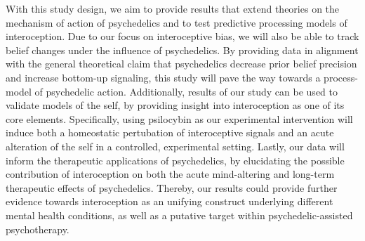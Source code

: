 \documentclass{article}
\begin{document}
\begin{comment}
    • Ensure that your predictions are defined precisely in terms of the specific independent and dependent variables. 
    • Listing them as Hypothesis 1, Hypothesis 2 etc (with corresponding H0 in each case, as appropriate) is recommended.
    • The description of hypotheses must commit to interpretation of all potential data patterns (those that are predicted and those that would run counter to predictions). You cannot interpret lack of evidence (e.g. a p>0.05 in a t-test) for the existence of an effect in null hypothesis significance testing as evidence for the absence of an effect. To be able to interpret data patterns other than the predicted effect or a significant difference in the opposite direction, you must commit to using Bayesian inferential methods or frequentist equivalence testing.
    • Where you describe your hypotheses, you must include a call-out to the mandatory Design Table (Table 1) – below. 
\end{comment}



With this study design, we aim to provide results that extend theories on the mechanism of action of psychedelics and to test predictive processing models of interoception. Due to our focus on interoceptive bias, we will also be able to track belief changes under the influence of psychedelics. 
By providing data in alignment with the general theoretical claim that psychedelics decrease prior belief precision and increase bottom-up signaling, this study will pave the way towards a process-model of psychedelic action. %
Additionally, results of our study can be used to validate models of the self, by providing insight into interoception as one of its core elements.  %
Specifically, using psilocybin as our experimental intervention will induce both a homeostatic pertubation of interoceptive signals and an acute alteration of the self in a controlled, experimental setting.
Lastly, our data will inform the therapeutic applications of psychedelics, by elucidating the possible contribution of interoception on both the acute mind-altering and long-term therapeutic effects of psychedelics. Thereby, our results could provide further evidence towards interoception as an unifying construct underlying different mental health conditions, as well as a putative target within psychedelic-assisted psychotherapy. %
\end{document}
